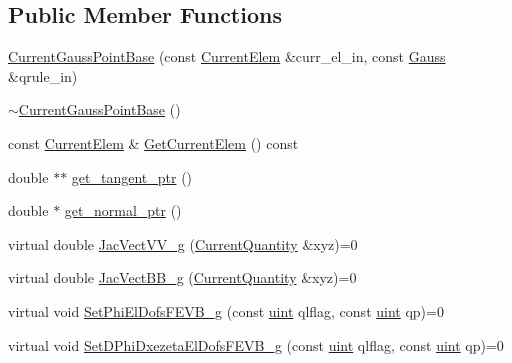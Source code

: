 \subsection*{Public Member Functions}
\begin{DoxyCompactItemize}
\item 
\mbox{\hyperlink{classfemus_1_1_current_gauss_point_base_aee804d2e69ceec8dbca20be1485a5c14}{Current\+Gauss\+Point\+Base}} (const \mbox{\hyperlink{classfemus_1_1_current_elem}{Current\+Elem}} \&curr\+\_\+el\+\_\+in, const \mbox{\hyperlink{classfemus_1_1_gauss}{Gauss}} \&qrule\+\_\+in)
\item 
\mbox{\hyperlink{classfemus_1_1_current_gauss_point_base_a8e1ed382c638f02ac176557e4b741a8e}{$\sim$\+Current\+Gauss\+Point\+Base}} ()
\item 
const \mbox{\hyperlink{classfemus_1_1_current_elem}{Current\+Elem}} \& \mbox{\hyperlink{classfemus_1_1_current_gauss_point_base_a09cbbd25b4bae6a6d0dee35b8b39c0cc}{Get\+Current\+Elem}} () const
\item 
double $\ast$$\ast$ \mbox{\hyperlink{classfemus_1_1_current_gauss_point_base_a4a2538a97ec12693a6f1e1d6692c9b66}{get\+\_\+tangent\+\_\+ptr}} ()
\item 
double $\ast$ \mbox{\hyperlink{classfemus_1_1_current_gauss_point_base_a22026e832b00dcd6ac5dc3915c5c064d}{get\+\_\+normal\+\_\+ptr}} ()
\item 
virtual double \mbox{\hyperlink{classfemus_1_1_current_gauss_point_base_ac8f11d39a5d6b88c69849f2820a97482}{Jac\+Vect\+V\+V\+\_\+g}} (\mbox{\hyperlink{classfemus_1_1_current_quantity}{Current\+Quantity}} \&xyz)=0
\item 
virtual double \mbox{\hyperlink{classfemus_1_1_current_gauss_point_base_adad673ff1adf7b5f6967f7701825e95e}{Jac\+Vect\+B\+B\+\_\+g}} (\mbox{\hyperlink{classfemus_1_1_current_quantity}{Current\+Quantity}} \&xyz)=0
\item 
virtual void \mbox{\hyperlink{classfemus_1_1_current_gauss_point_base_aec970c4eef875b43169cb74674276e29}{Set\+Phi\+El\+Dofs\+F\+E\+V\+B\+\_\+g}} (const \mbox{\hyperlink{_typedefs_8hpp_a91ad9478d81a7aaf2593e8d9c3d06a14}{uint}} qlflag, const \mbox{\hyperlink{_typedefs_8hpp_a91ad9478d81a7aaf2593e8d9c3d06a14}{uint}} qp)=0
\item 
virtual void \mbox{\hyperlink{classfemus_1_1_current_gauss_point_base_af1e7dd520b7b288fc1ff02674745fbcd}{Set\+D\+Phi\+Dxezeta\+El\+Dofs\+F\+E\+V\+B\+\_\+g}} (const \mbox{\hyperlink{_typedefs_8hpp_a91ad9478d81a7aaf2593e8d9c3d06a14}{uint}} qlflag, const \mbox{\hyperlink{_typedefs_8hpp_a91ad9478d81a7aaf2593e8d9c3d06a14}{uint}} qp)=0
$$
\end{DoxyCompactItemize}
